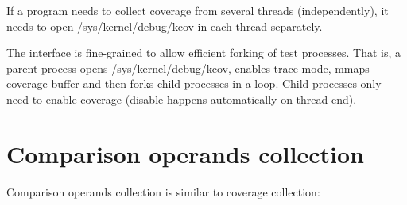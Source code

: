 \documentclass[a4paper,8pt,english]{sphinxmanual}
\begin{document}
If a program needs to collect coverage from several threads (independently),
it needs to open /sys/kernel/debug/kcov in each thread separately.

The interface is fine-grained to allow efficient forking of test processes.
That is, a parent process opens /sys/kernel/debug/kcov, enables trace mode,
mmaps coverage buffer and then forks child processes in a loop. Child processes
only need to enable coverage (disable happens automatically on thread end).


\section{Comparison operands collection}
\label{dev-tools/kcov:comparison-operands-collection}
Comparison operands collection is similar to coverage collection:
\end{document}
